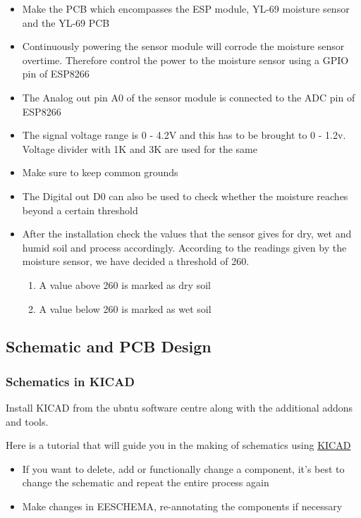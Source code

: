 \documentclass[16pt]{article}
\begin{document}
\begin{itemize}

\item
  Make the PCB which encompasses the ESP module, YL-69 moisture sensor
  and the YL-69 PCB
\item
  Continuously powering the sensor module will corrode the moisture
  sensor overtime. Therefore control the power to the moisture sensor
  using a GPIO pin of ESP8266
\item
  The Analog out pin A0 of the sensor module is connected to the ADC pin
  of ESP8266
\item
  The signal voltage range is 0 - 4.2V and this has to be brought to 0 -
  1.2v. Voltage divider with 1K and 3K are used for the same
\item
  Make sure to keep common grounds
\item
  The Digital out D0 can also be used to check whether the moisture
  reaches beyond a certain threshold
\item
  After the installation check the values that the sensor gives for dry,
  wet and humid soil and process accordingly. According to the readings given by the 
  moisture sensor, we have decided a threshold of 260. 
\begin{enumerate}
 \item A value above 260 is marked as dry soil
 \item A value below 260 is marked as wet soil 
\end{enumerate}


  
\end{itemize}

\vspace{0.5cm}

\subsection{Schematic and PCB Design}



\subsubsection{Schematics in KICAD}
Install KICAD from the ubntu software centre along with the additional
addons and tools.

Here is a tutorial that will guide you in the making of schematics using
\href{https://www.youtube.com/watch?v=rkQ0nVX1q1k}{KICAD}

\begin{itemize}

\item
  If you want to delete, add or functionally change a component, it's
  best to change the schematic and repeat the entire process again
\item
  Make changes in EESCHEMA, re-annotating the components if necessary
  \vspace{0.2cm}
\end{itemize}
\end{document}
